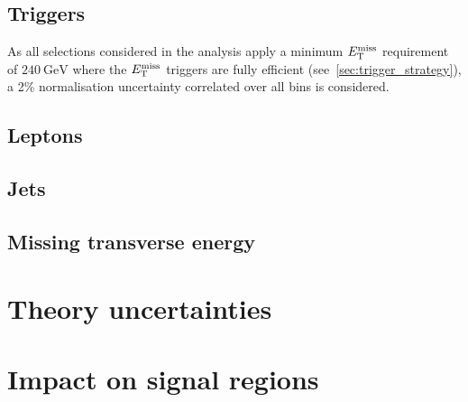 \subsection{Triggers}

As all selections considered in the analysis apply a minimum $E_{\textrm{T}}^{\textrm{miss}}$ requirement of $\SI{240}{\GeV}$ where the $E_{\textrm{T}}^{\textrm{miss}}$ triggers are fully efficient (see~\cref{sec:trigger_strategy}), a 2\% normalisation uncertainty correlated over all bins is considered. 

\subsection{Leptons}



\subsection{Jets}

\subsection{Missing transverse energy}

\section{Theory uncertainties}


\section{Impact on signal regions}